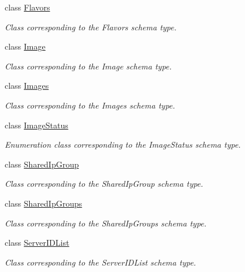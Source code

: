 \begin{DoxyCompactItemize}
class \hyperlink{classopenstack_1_1xml_1_1Flavors}{Flavors}
\begin{DoxyCompactList}\small\item\em Class corresponding to the Flavors schema type. \item\end{DoxyCompactList}\item 
class \hyperlink{classopenstack_1_1xml_1_1Image}{Image}
\begin{DoxyCompactList}\small\item\em Class corresponding to the Image schema type. \item\end{DoxyCompactList}\item 
class \hyperlink{classopenstack_1_1xml_1_1Images}{Images}
\begin{DoxyCompactList}\small\item\em Class corresponding to the Images schema type. \item\end{DoxyCompactList}\item 
class \hyperlink{classopenstack_1_1xml_1_1ImageStatus}{ImageStatus}
\begin{DoxyCompactList}\small\item\em Enumeration class corresponding to the ImageStatus schema type. \item\end{DoxyCompactList}\item 
class \hyperlink{classopenstack_1_1xml_1_1SharedIpGroup}{SharedIpGroup}
\begin{DoxyCompactList}\small\item\em Class corresponding to the SharedIpGroup schema type. \item\end{DoxyCompactList}\item 
class \hyperlink{classopenstack_1_1xml_1_1SharedIpGroups}{SharedIpGroups}
\begin{DoxyCompactList}\small\item\em Class corresponding to the SharedIpGroups schema type. \item\end{DoxyCompactList}\item 
class \hyperlink{classopenstack_1_1xml_1_1ServerIDList}{ServerIDList}
\begin{DoxyCompactList}\small\item\em Class corresponding to the ServerIDList schema type. \item\end{DoxyCompactList}\item 

\end{DoxyCompactItemize}
